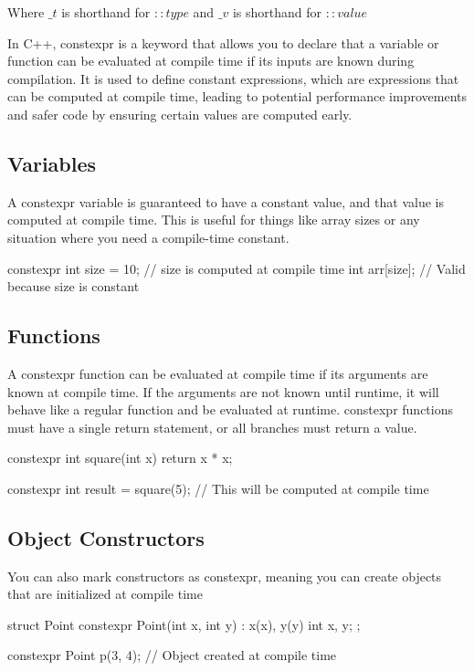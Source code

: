 \documentclass{report}
\begin{document}
   Where $\_t$ is shorthand for $::type$ and $\_v$ is shorthand for $::value$

   \pagebreak 
   \bigbreak \noindent 
   In C++, constexpr is a keyword that allows you to declare that a variable or function can be evaluated at compile time if its inputs are known during compilation. It is used to define constant expressions, which are expressions that can be computed at compile time, leading to potential performance improvements and safer code by ensuring certain values are computed early.
   \bigbreak \noindent 
   \subsection{Variables}
   \bigbreak \noindent 
   A constexpr variable is guaranteed to have a constant value, and that value is computed at compile time. This is useful for things like array sizes or any situation where you need a compile-time constant.
   \bigbreak \noindent 
   \begin{cppcode}
       constexpr int size = 10;  // size is computed at compile time
       int arr[size];            // Valid because size is constant
   \end{cppcode}

   \bigbreak \noindent 
   \subsection{Functions}
   \bigbreak \noindent 
   A constexpr function can be evaluated at compile time if its arguments are known at compile time. If the arguments are not known until runtime, it will behave like a regular function and be evaluated at runtime.
   \bigbreak \noindent 
   constexpr functions must have a single return statement, or all branches must return a value.
   \bigbreak \noindent 
   \begin{cppcode}
       constexpr int square(int x) {
           return x * x;
       }

       constexpr int result = square(5);  // This will be computed at compile time
   \end{cppcode}

   \pagebreak 
   \subsection{Object Constructors}
   \bigbreak \noindent 
   You can also mark constructors as constexpr, meaning you can create objects that are initialized at compile time
   \bigbreak \noindent 
   \begin{cppcode}
       struct Point {
           constexpr Point(int x, int y) : x(x), y(y) {}
           int x, y;
       };

       constexpr Point p(3, 4);  // Object created at compile time
   \end{cppcode}
\end{document}
